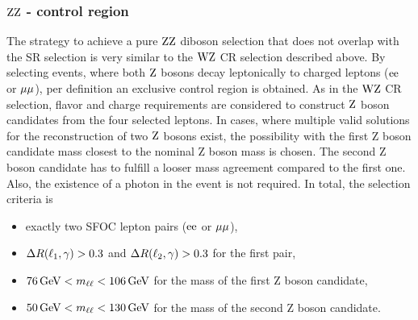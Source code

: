 \subsubsection*{$\mathrm{Z}\mathrm{Z}$ - control region}\label{sec:VR}
The strategy to achieve a pure $\mathrm{Z}\mathrm{Z}$ diboson selection that does not overlap with the SR selection is very similar to the $\mathrm{W}\mathrm{Z}$ CR selection described above. By selecting events, where both $\mathrm{Z}$ bosons decay leptonically to charged leptons ($\mathrm{e}\mathrm{e}$ or $\mu\mu$), per definition an exclusive control region is obtained. As in the $\mathrm{W}\mathrm{Z}$ CR selection, flavor and charge requirements are considered to construct $\mathrm{Z}$ boson candidates from the four selected leptons. In cases, where multiple valid solutions for the reconstruction of two $\mathrm{Z}$ bosons exist, the possibility with the first Z boson candidate mass closest to the nominal Z boson mass is chosen. The second Z boson candidate has to fulfill a looser mass agreement compared to the first one. Also, the existence of a photon in the event is not required. In total, the selection criteria is
\begin{itemize}
 \item exactly two SFOC lepton pairs ($\mathrm{e}\mathrm{e}$ or $\mu\mu$),
 \item $\Delta R(\ell_1,\gamma)>0.3$ and $\Delta R(\ell_2,\gamma)>0.3$ for the first pair,
 \item $76\,\text{Ge\hspace{-.08em}V}<m_{\ell\ell}<106\,\text{Ge\hspace{-.08em}V}$ for the mass of the first Z boson candidate,
 \item $50\,\text{Ge\hspace{-.08em}V}<m_{\ell\ell}<130\,\text{Ge\hspace{-.08em}V}$ for the mass of the second Z boson candidate.
\end{itemize}
